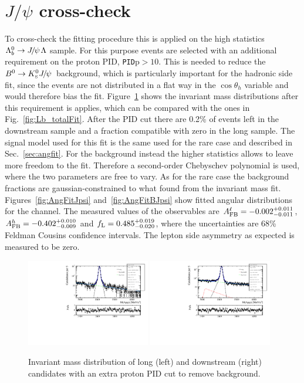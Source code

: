 \section{$J/\psi$ cross-check}

To cross-check the fitting procedure this is applied on the high statistics $\Lb\to\jpsi\Lz$ sample.
For this purpose events are selected with an additional requirement on the proton PID, \verb!PID!p$ > 10$.
This is needed to reduce the $\Bz\to\KS\jpsi$ background, which is particularly important for the hadronic side fit, 
since the \KS events are not distributed in a flat way in the $\cos\theta_h$ variable and would therefore bias the fit.
Figure~\ref{fig:Jpsimass_angular} shows the invariant mass distributions after this requirement is applies, which 
can be compared with the ones in Fig.~\ref{fig:Lb_totalFit}. %
After the PID cut there are 0.2\% of \KS events left in the downstream sample and a fraction
compatible with zero in the long sample.
The signal model used for this fit is the same used for the rare case and described in Sec.~\ref{sec:angfit}.
For the background instead the higher statistics allows to leave more freedom to the fit.
Therefore a second-order Chebyschev polynomial is used, where the two parameters are
free to vary. As for the rare case the background fractions are gaussian-constrained
to what found from the invariant mass fit. Figures~\ref{fig:AngFitJpsi} and~\ref{fig:AngFitBJpsi} show
fitted angular distributions for the \jpsi channel. The measured values of the observables
are $A_{\rm FB}^\ell = -0.002^{+0.011}_{-0.011}$, $A_{\rm FB}^h = -0.402^{+0.010}_{-0.009}$
and $f_{\rm L} = 0.485^{+0.019}_{-0.020}$, where the uncertainties are 68\% Feldman Cousins 
confidence intervals. The lepton side asymmetry as expected is measured to be zero.
%
\begin{figure}
\centering
\includegraphics[width=0.48\textwidth]{Lmumu/figs/Jpsi_default_LL_log_fitAndRes.pdf}
\includegraphics[width=0.48\textwidth]{Lmumu/figs/Jpsi_default_DD_log_fitAndRes.pdf}
\caption{Invariant mass distribution of \Lb\ra\jpsi\Lz long (left) and downstream (right)
candidates with an extra proton PID cut to remove \KS background. }
\label{fig:Jpsimass_angular}
\end{figure}
